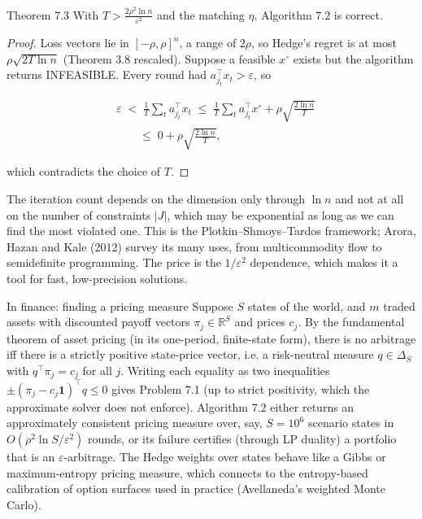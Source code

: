 \documentclass[11pt,a4paper,openany]{book}
\newcommand{\R}{\mathbb{R}}
\newcommand{\eps}{\varepsilon}
\newcommand{\abs}[1]{\lvert #1\rvert}
\newcommand{\simplex}{\Delta}
\begin{document}
\begin{bthm}{Theorem 7.3}
With $T>\frac{2\rho^2\ln n}{\eps^2}$ and the matching $\eta$, Algorithm 7.2 is correct.
\end{bthm}

\begin{proof}
Loss vectors lie in $[-\rho,\rho]^n$, a range of $2\rho$, so Hedge's regret is at most $\rho\sqrt{2T\ln n}$ (Theorem 3.8 rescaled). Suppose a feasible $x^\circ$ exists but the algorithm returns INFEASIBLE. Every round had $a_{j_t}^\top x_t>\eps$, so

\[\begin{aligned}&\eps\;<\;\frac1T\sum_ta_{j_t}^\top x_t\;\le\;\frac1T\sum_ta_{j_t}^\top x^\circ+\rho\sqrt{\frac{2\ln n}{T}}\\
&\qquad\le\;0+\rho\sqrt{\frac{2\ln n}{T}},\end{aligned}\]

which contradicts the choice of $T$.
\end{proof}

The iteration count depends on the dimension only through $\ln n$ and not at all on the number of constraints $\abs{J}$, which may be exponential as long as we can find the most violated one. This is the Plotkin–Shmoys–Tardos framework; Arora, Hazan and Kale (2012) survey its many uses, from multicommodity flow to semidefinite programming. The price is the $1/\eps^2$ dependence, which makes it a tool for fast, low-precision solutions.

\begin{bfin}{In finance: finding a pricing measure}
Suppose $S$ states of the world, and $m$ traded assets with discounted payoff vectors $\pi_j\in\R^S$ and prices $c_j$. By the fundamental theorem of asset pricing (in its one-period, finite-state form), there is no arbitrage iff there is a strictly positive state-price vector, i.e. a risk-neutral measure $q\in\simplex_S$ with $q^\top\pi_j=c_j$ for all $j$. Writing each equality as two inequalities $\pm(\pi_j-c_j\mathbf 1)^\top q\le0$ gives Problem 7.1 (up to strict positivity, which the approximate solver does not enforce). Algorithm 7.2 either returns an approximately consistent pricing measure over, say, $S=10^6$ scenario states in $O(\rho^2\ln S/\eps^2)$ rounds, or its failure certifies (through LP duality) a portfolio that is an $\eps$-arbitrage. The Hedge weights over states behave like a Gibbs or maximum-entropy pricing measure, which connects to the entropy-based calibration of option surfaces used in practice (Avellaneda's weighted Monte Carlo).
\end{bfin}
\end{document}
